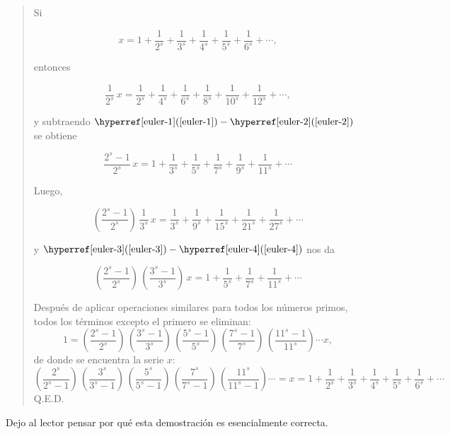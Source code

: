 \documentclass{article}
\begin{document}
\begin{quote}
Si

\begin{equation}
\label{euler-1}
x = 1 + \frac{1}{2^s} + \frac{1}{3^s} + \frac{1}{4^s} + \frac{1}{5^s} + \frac{1}{6^s} + \cdots,
\end{equation}

\noindent entonces

\begin{equation}
\label{euler-2}
\frac{1}{2^s}\,x = \frac{1}{2^s} + \frac{1}{4^s} + \frac{1}{6^s} + \frac{1}{8^s} + \frac{1}{10^s} + \frac{1}{12^s} + \cdots,
\end{equation}

\noindent y subtraendo $\text{\eqnref{euler-1}}-\text{\eqnref{euler-2}}$ se obtiene

\begin{equation}
\label{euler-3}
\frac{2^s - 1}{2^s}\,x = 1 + \frac{1}{3^s} + \frac{1}{5^s} + \frac{1}{7^s} + \frac{1}{9^s} + \frac{1}{11^s} + \cdots
\end{equation}

Luego,

\begin{equation}
\label{euler-4}
\left(\frac{2^s - 1}{2^s}\right)\,\frac{1}{3^s}\,x = \frac{1}{3^s} + \frac{1}{9^s} + \frac{1}{15^s} + \frac{1}{21^s} + \frac{1}{27^s} + \cdots
\end{equation}

\noindent y $\text{\eqnref{euler-3}} - \text{\eqnref{euler-4}}$ nos da

\[ \left(\frac{2^s - 1}{2^s}\right)\,\left(\frac{3^s - 1}{3^s}\right)\,x = 1 + \frac{1}{5^s} + \frac{1}{7^s} + \frac{1}{11^s} + \cdots \]

Después de aplicar operaciones similares para todos los números primos, todos los términos excepto el primero se eliminan:
$$1 = \left(\frac{2^s - 1}{2^s}\right)\,\left(\frac{3^s - 1}{3^s}\right)\,\left(\frac{5^s - 1}{5^s}\right)\,\left(\frac{7^s - 1}{7^s}\right)\,\left(\frac{11^s - 1}{11^s}\right)\cdots x,$$
de donde se encuentra la serie $x$:
$$\left(\frac{2^s}{2^s - 1}\right)\,\left(\frac{3^s}{3^s - 1}\right)\,\left(\frac{5^s}{5^s - 1}\right)\,\left(\frac{7^s}{7^s - 1}\right)\,\left(\frac{11^s}{11^s - 1}\right)\cdots = x = 1 + \frac{1}{2^s} + \frac{1}{3^s} + \frac{1}{4^s} + \frac{1}{5^s} + \frac{1}{6^s} + \cdots$$
Q.E.D.
\end{quote}

Dejo al lector pensar por qué esta demostración es esencialmente correcta.
\end{document}
